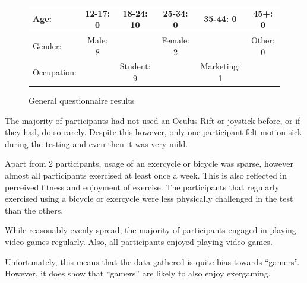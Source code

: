 \documentclass[a4paper, 11pt]{article}
\begin{document}
\begin{figure}[H]
\centering

\begin{tabular}{|p{4cm}|c c c c c|}
\hline
Age: &12-17: 0 &18-24: 10 &25-34: 0 &35-44: 0 &45+: 0\\
\hline
Gender: & Male: 8 & & Female: 2 & & Other: 0 \\
\hline
Occupation: & & Student: 9 & & Marketing: 1 & \\
\hline
\end{tabular}

\caption{General questionnaire results}
\end{figure}

\begin{multicols}{2}

The majority of participants had not used an Oculus Rift or joystick before, or if they had, do so rarely. Despite this however, only one participant felt motion sick during the testing and even then it was very mild.

Apart from 2 participants, usage of an exercycle or bicycle was sparse, however almost all participants exercised at least once a week. This is also reflected in perceived fitness and enjoyment of exercise. The participants that regularly exercised using a bicycle or exercycle were less physically challenged in the test than the others.

While reasonably evenly spread, the majority of participants engaged in playing video games regularly. Also, all participants enjoyed playing video games.

Unfortunately, this means that the data gathered is quite bias towards ``gamers''. However, it does show that ``gamers'' are likely to also enjoy exergaming.

\end{multicols}
\end{document}
